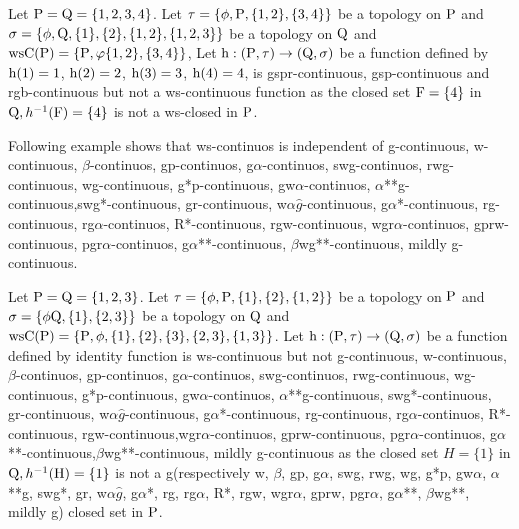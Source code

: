 \begin{exm}\label{exam3.2.5}
Let $\mathrm{P}=\mathrm{Q}= \{1, 2, 3, 4\}$. Let $\tau =\{\phi, \mathrm{P}, \{1,2\}, \{3,4 \}\}$ be a topology on $\mathrm{P}$ and $\sigma =\{\phi, \mathrm{Q}, \{1\}, \{2\}, \{1, 2\},\{1,2,3\}\}$ be a topology on $\mathrm{Q}$ and $\mathrm{ws}\mathrm{C}(\mathrm{P})=\{\mathrm{P}, \varphi \{1,2\}, \{3,4\}\}$, Let $\mathrm{h}: (\mathrm{P}, \tau)\to (\mathrm{Q}, \sigma)$ be a function defined by $\mathrm{h}(1)= 1$, $\mathrm{h}(2)=2$, $\mathrm{h}(3)=3$, $\mathrm{h}(4)=4$, is gspr-continuous, gsp-continuous and rgb-continuous but not a ws-continuous function as the closed set $\mathrm{F}=\{4\}$ in $\mathrm{Q}, h^{-1} (\mathrm{F})=\{4\}$ is not a ws-closed in $\mathrm{P}$.
\end{exm}

\begin{rem}\label{rem3.2.1}
Following example shows that ws-continuos is independent of g-continuous, w-continuous, $\beta$-continuos, gp-continuos, g$\alpha$-continuos, swg-continuos, rwg-continuous, wg-continuous, g*p-continuous, gw$\alpha$-continuos, $\alpha$**g-continuous,\break swg*-continuous, gr-continuous, w$\alpha\hat{g}$-continuous, g$\alpha$*-continuous, rg-continuous, rg$\alpha$-continuos, R*-continuous, rgw-continuous, wgr$\alpha$-continuos, gprw-continuous, pgr$\alpha$-continuos, g$\alpha${*}{*}-continuous, $\beta$wg{*}{*}-continuous, mildly g-continuous.
\end{rem}

\begin{exm}\label{exam3.2.6}
Let $\mathrm{P}= \mathrm{Q} = \{1, 2, 3\}$. Let $\tau = \{\phi, \mathrm{P}, \{1\}, \{2\}, \{1, 2\}\}$ be a topology on $\mathrm{P}$ and $\sigma =\{\phi \mathrm{Q}, \{1\},\{2,3\}\}$ be a topology on $\mathrm{Q}$ and $\ws\TSC(\TSP)=\{\TSP, \phi,\{1\}, \{2\}, \{3\},\break \{2,3\},\{1, 3\}\}$. Let $\mathrm{h}:(\mathrm{P}, \tau)\to (\mathrm{Q}, \sigma)$ be a function defined by identity function is ws-continuous but not g-continuous, w-continuous, $\beta$-continuos, gp-continuos, g$\alpha$-continuos, swg-continuos, rwg-continuous, wg-continuous, g*p-continuous, gw$\alpha$-continuos, $\alpha${*}{*}g-continuous, swg*-continuous, gr-continuous, w$\alpha\hat{g}$-continuous, g$\alpha$*-continuous, rg-continuous, rg$\alpha$-continuos, R*-continuous, rgw-continuous,\break wgr$\alpha$-continuos, gprw-continuous, pgr$\alpha$-continuos, g$\alpha${*}{*}-continuous,\break $\beta$wg{*}{*}-continuous, mildly g-continuous as the closed set $H=\{1\}$ in $\mathrm{Q}, h^{-1} (\mathrm{H})=\{1\}$ is not a g(respectively w, $\beta$, gp, g$\alpha$, swg, rwg, wg, g*p, gw$\alpha$, $\alpha$**g, swg*, gr, w$\alpha\hat{g}$, g$\alpha$*, rg, rg$\alpha$, R*, rgw, wgr$\alpha$, gprw, pgr$\alpha$, g$\alpha${*}{*}, $\beta$wg{*}{*}, mildly g) closed set in $\mathrm{P}$.
\end{exm}

